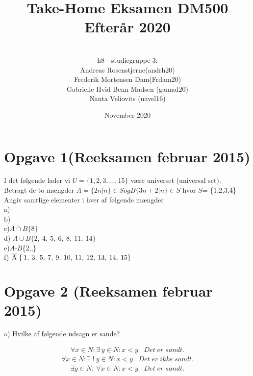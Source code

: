 \documentclass{article}
\title{Take-Home Eksamen DM500 Efterår 2020}
\author{
\\
h8 - studiegruppe 3:
\\
Andreas Rosenstjerne(andrh20)
\\
Frederik Mortensen Dam(Frdam20)
\\
Gabrielle Hvid Benn Madsen (gamad20)
\\
Nanta Veliovits (navel16)
\\
}
\date{November 2020}
\begin{document}
\maketitle
\pagebreak

\section{Opgave 1(Reeksamen februar 2015)}
I det følgende lader vi $U = \{ 1,2,3,...,15 \} $ være universet (universal set). 
\\
\newline Betragt de to mængder
\newline
\begin{math}
A = \{ 2n|n \} \in S og B \{ 3n + 2|n \} \in S 
\end{math}
\newline hvor $S$= \{1,2,3,4\}
\\
\newline Angiv samtlige elementer i hver af følgende mængder
\\
\newline
a)
\\
\newline
b)
\\
\newline
c)\;$A \cap B \{ 8 \} $
\\
\newline
d)\; $A \cup B \{2,\:4,\:5,\:6,\:8,\:11,\:14\} $
\\
\newline
e)\;$A$\:-\:$B$\:\{2,,\}
\\
\newline
f)\; $\overline{\rm A}\;\{\:1,\:3,\:5,\:7,\:9,\:10,\:11,\:12,\:13,\:14,\:15\} $

\section{Opgave 2 (Reeksamen februar 2015)}
a)\; Hvilke af følgende udsagn er sande?

\begin{align*}
\forall x \in N:\exists\:y \in N: x< y \;\;\;Det\;er\;sandt.
\end{align*} 
\begin{align*}
\forall x \in N:\exists\;!\:y \in N: x< y \;\;\;Det\;er\;ikke\;sandt.
\end{align*} 
\begin{align*}
\exists y \in N:\:\forall x \in N: x< y \;\;\;Det\;er\;sandt.
\end{align*} 
\end{document}
